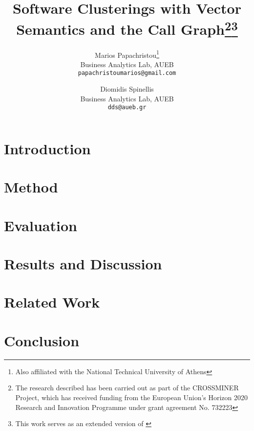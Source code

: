 \documentclass[a4paper, 11pt]{article}
\title{\textbf{Software Clusterings with Vector Semantics and the Call Graph}\footnote{The research described has been carried out as part of the CROSSMINER Project, which has received funding from the European Union's Horizon 2020 Research and Innovation Programme under grant agreement No. 732223}\;\footnote{This work serves as an extended version of \cite{sade}}}
\author{
  Marios Papachristou\footnote{Also affiliated with the National Technical University of Athens} \\
  Business Analytics Lab, AUEB \\
  \texttt{papachristoumarios@gmail.com}
  \and
  Diomidis Spinellis \\
  Business Analytics Lab, AUEB \\
  \texttt{dds@aueb.gr}
}
\date{}
\begin{document}
\maketitle

\section{Introduction}

\section{Method}

\section{Evaluation}

\section{Results and Discussion}

\section{Related Work} 

\section{Conclusion} 

\newpage

\nocite{*}


\end{document}
